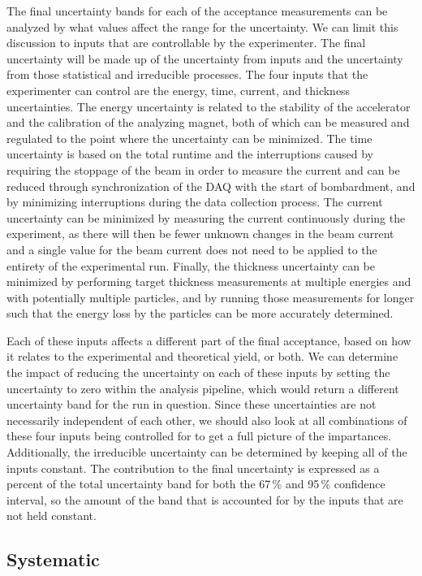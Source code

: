 The final uncertainty bands for each of the acceptance measurements can
be analyzed by what values affect the range for the uncertainty. We can
limit this discussion to inputs that are controllable by the
experimenter. The final uncertainty will be made up of the uncertainty
from inputs and the uncertainty from those statistical and irreducible
processes. The four inputs that the experimenter can control are the
energy, time, current, and thickness uncertainties. The energy
uncertainty is related to the stability of the accelerator and the
calibration of the analyzing magnet, both of which can be measured and
regulated to the point where the uncertainty can be minimized. The time
uncertainty is based on the total runtime and the interruptions caused
by requiring the stoppage of the beam in order to measure the current
and can be reduced through synchronization of the DAQ with the start of
bombardment, and by minimizing interruptions during the data collection
process. The current uncertainty can be minimized by measuring the
current continuously during the experiment, as there will then be fewer
unknown changes in the beam current and a single value for the beam
current does not need to be applied to the entirety of the experimental
run. Finally, the thickness uncertainty can be minimized by performing
target thickness measurements at multiple energies and with potentially
multiple particles, and by running those measurements for longer such
that the energy loss by the particles can be more accurately determined.

Each of these inputs affects a different part of the final acceptance,
based on how it relates to the experimental and theoretical yield, or
both. We can determine the impact of reducing the uncertainty on each of
these inputs by setting the uncertainty to zero within the analysis
pipeline, which would return a different uncertainty band for the run in
question. Since these uncertainties are not necessarily independent of
each other, we should also look at all combinations of these four inputs
being controlled for to get a full picture of the impartances.
Additionally, the irreducible uncertainty can be determined by keeping
all of the inputs constant. The contribution to the final uncertainty is
expressed as a percent of the total uncertainty band for both the 67\,\%
and 95\,\% confidence interval, so the amount of the band that is
accounted for by the inputs that are not held constant.

\subsection{Systematic}


